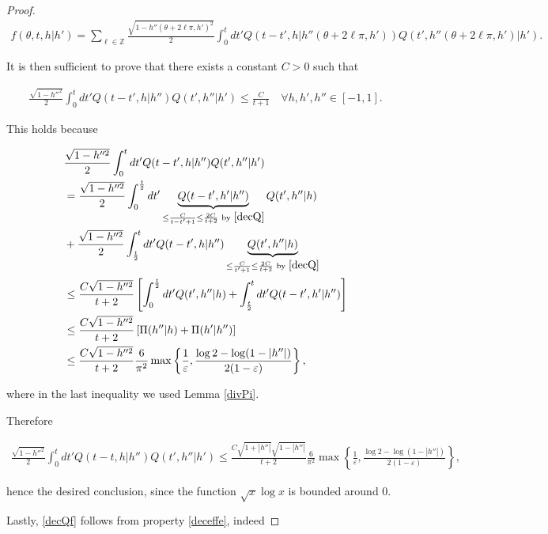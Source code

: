 \documentclass[a4paper,10pt,reqno]{amsart}
\numberwithin{equation}{subsection}
\numberwithin{figure}{subsection}
\begin{document}
\begin{proof}
{\footnotesize\begin{align*}
f(\theta,t,h|h')=\sum_{\ell\in\mathbb{Z}}\frac{\sqrt{1-h''(\theta+2\ell\pi,h')^2}}{2}\int_0^tdt' Q(t-t',h|h''(\theta+2\ell\pi,h'))Q(t',h''(\theta+2\ell\pi,h')|h').
\end{align*}}

It is then sufficient to prove that there exists a constant $C>0$ such that

\begin{align*}
\frac{\sqrt{1-h''^2}}{2}\int_0^tdt' Q(t-t',h|h'')Q(t',h''|h')\leq\frac{C}{t+1}\quad\forall h,h',h''\in[-1,1].
\end{align*}

This holds because

\begin{align*}
&\frac{\sqrt{1-h''^2}}{2}\int_0^tdt' Q(t-t',h|h'')Q(t',h''|h')
\\
&=\frac{\sqrt{1-h''^2}}{2}\int_0^{\frac{t}{2}}dt'  \underbrace{Q(t-t',h'|h'')}_{\leq\frac{C}{t-t'+1}\leq\frac{2C}{t+2}\textrm{ by }\eqref{decQ}}Q(t',h''|h)
\\
&+\frac{\sqrt{1-h''^2}}{2}\int_{\frac{t}{2}}^tdt' Q(t-t',h|h'')\underbrace{Q(t',h''|h)}_{\leq\frac{C}{t'+1}\leq\frac{2C}{t+2}\textrm{ by }\eqref{decQ}}
\\
&\leq\frac{C\sqrt{1-h''^2}}{t+2}\left[\int_0^{\frac{t}{2}}dt' Q(t',h''|h)+\int_{\frac{t}{2}}^tdt' Q(t-t',h'|h'')\right]
\\
&\leq\frac{C\sqrt{1-h''^2}}{t+2}\left[\Pi(h''|h)+\Pi(h'|h'')\right]
\\
&\leq\frac{C\sqrt{1-h''^2}}{t+2}\frac{6}{\pi^2}\max\left\{\frac{1}{\varepsilon},\frac{\log 2-\log(1-|h''|)}{2(1-\varepsilon)}\right\},
\end{align*}

where in the last inequality we used Lemma \ref{divPi}.

Therefore

{\tiny\begin{align*}
\frac{\sqrt{1-h''^2}}{2}\int_0^tdt' Q(t-t,h|h'')Q(t',h''|h')\leq\frac{C\sqrt{1+|h''|}\sqrt{1-|h''|}}{t+2}\frac{6}{\pi^2}\max\left\{\frac{1}{\varepsilon},\frac{\log 2-\log(1-|h''|)}{2(1-\varepsilon)}\right\},
\end{align*}}

hence the desired conclusion, since the function $\sqrt{x}\log x$ is bounded around $0$.

Lastly, \eqref{decQf} follows from property \eqref{deceffe}, indeed


\end{proof}
\end{document}
